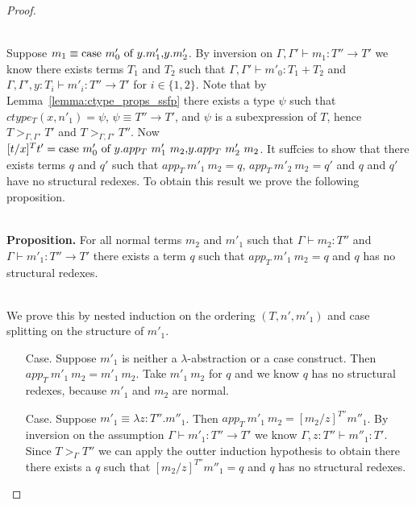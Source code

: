 \begin{proof}
\begin{itemize}
  \ \\
  Suppose $m_1 \equiv \mbox{case}\ m'_0\ \text{of}\ y\text{.}m'_1\text{,}y\text{.}m'_2$.
  By inversion on
  $\Gamma,\Gamma' \vdash m_1 : T'' \to T'$ we know there exists terms $T_1$ and $T_2$ such that
  $\Gamma,\Gamma' \vdash m'_0:T_1+T_2$ and
  $\Gamma,\Gamma',y:T_i \vdash m'_i:T'' \to T'$
  for $i \in \{1,2\}$.  Note that by Lemma~\ref{lemma:ctype_props_ssfp} there exists a type $\psi$ such that 
  $ctype_T(x, n'_1) = \psi$, $\psi \equiv T'' \to T'$, and $\psi$ is a subexpression
  of $T$, hence $T >_{\Gamma,\Gamma'} T'$ and $T >_{\Gamma,\Gamma'} T''$.  
  Now $[t/x]^T t' = \ccon{m'_0}{y}{app_T\ m'_1\ m_2}{app_T\ m'_2\ m_2}$.  It suffcies to show that
  there exists terms $q$ and $q'$ such that $app_T\ m'_1\ m_2 = q$, $app_T\ m'_2\ m_2 = q'$ and $q$ and $q'$ have
  no structural redexes.  To obtain this result we prove the following proposition.
  
  \ \\
  {\bf Proposition.}  For all normal terms $m_2$ and $m'_1$ such that  
  $\Gamma \vdash m_2 : T''$ and $\Gamma \vdash m'_1:T'' \to T'$
  there exists a term $q$ such that $app_T\ m'_1\ m_2 = q$ and $q$ has no structural redexes.
  
  \ \\
  We prove this by nested induction on the ordering $(T, n', m'_1)$ and case splitting on 
  the structure of $m'_1$.
  \begin{itemize}
  \item[Case.] Suppose $m'_1$ is neither a $\lambda$-abstraction or a case construct.  Then
    $app_T\  m'_1\ m_2 = m'_1\ m_2$.  Take $m'_1\ m_2$ for $q$ and we know $q$ has no structural
    redexes, because $m'_1$ and $m_2$ are normal.
    
  \item[Case.] Suppose $m'_1 \equiv \lambda z:T''.m''_1$.  Then $app_T\ m'_1\ m_2 = [m_2/z]^{T''} m''_1$.
    By inversion on the assumption $\Gamma \vdash m'_1:T'' \to T'$ we know 
    $\Gamma,z:T'' \vdash m''_1:T'$.  Since $T >_{\Gamma} T''$ we can apply the outter induction
    hypothesis to obtain there there exists a $q$ such that $[m_2/z]^{T''} m''_1 = q$ and 
    $q$ has no structural redexes.
    

\end{itemize}
\end{itemize}
\end{proof}
